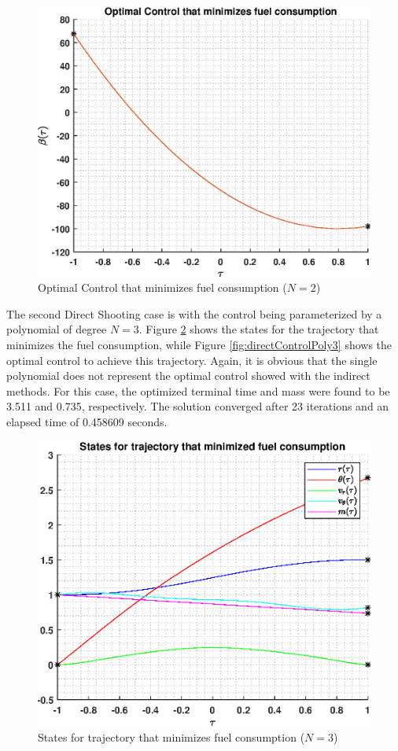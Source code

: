 \documentclass[]{article}
\begin{document}
\begin{figure}
	\centering
	\includegraphics[scale=0.75]{directControlPoly2.eps}
	\caption{Optimal Control that minimizes fuel consumption  (\(N = 2\))}
	\label{fig:directControlPoly2}
\end{figure}
\vspace{2mm}\newline 
The second Direct Shooting case is with the control being parameterized by a polynomial of degree \(N = 3\). Figure \ref{fig:directStatesPoly3} shows the states for the trajectory that minimizes the fuel consumption, while Figure \ref{fig:directControlPoly3} shows the optimal control to achieve this trajectory. Again, it is obvious that the single polynomial does not represent the optimal control showed with the indirect methods. For this case, the optimized terminal time and mass were found to be 3.511 and 0.735, respectively. The solution converged after 23 iterations and an elapsed time of 0.458609 seconds.
\begin{figure}
	\centering
	\includegraphics[scale=0.75]{directStatesPoly3.eps}
	\caption{States for trajectory that minimizes fuel consumption (\(N = 3\))}
	\label{fig:directStatesPoly3}
\end{figure}
\end{document}
